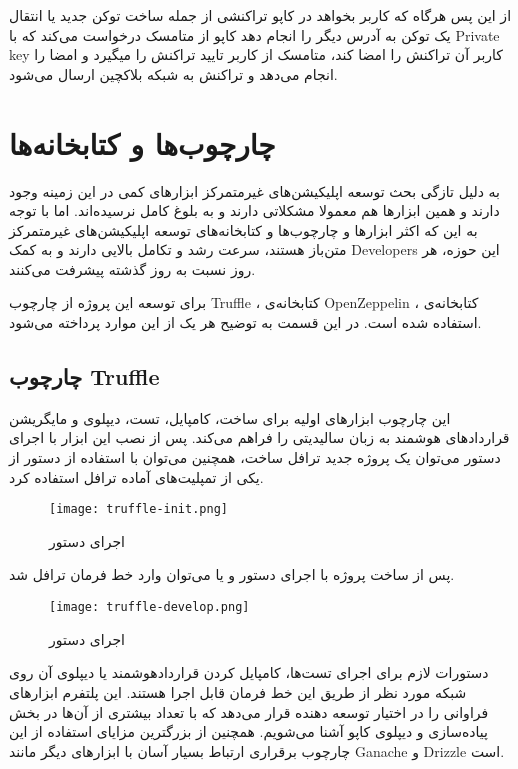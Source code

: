 از این پس هرگاه که کاربر بخواهد در کاپو تراکنشی از جمله ساخت توکن جدید یا انتقال یک توکن به آدرس دیگر را انجام دهد کاپو از متامسک درخواست می‌کند که با
\gls{Private key}
کاربر آن تراکنش را امضا کند، متامسک از کاربر تایید تراکنش را میگیرد و امضا را انجام می‌دهد و تراکنش به شبکه بلاکچین ارسال می‌شود.


\section{چارچوب‌ها و کتابخانه‌ها}
به دلیل تازگی بحث توسعه اپلیکیشن‌های غیرمتمرکز ابزارهای کمی در این زمینه وجود دارند و همین ابزارها هم معمولا مشکلاتی دارند و به بلوغ کامل نرسیده‌اند. اما با توجه به این که اکثر ابزارها و چارچوب‌ها و کتابخانه‌های توسعه اپلیکیشن‌های غیرمتمرکز متن‌باز هستند، سرعت رشد و تکامل بالایی دارند و به کمک
\glspl{Developer}
این حوزه، هر روز نسبت به روز گذشته پیشرفت می‌کنند.

برای توسعه این پروژه از
چارچوب Truffle
،
کتابخانه‌ی OpenZeppelin
،
کتابخانه‌ی
استفاده شده است. در این قسمت به توضیح هر یک از این موارد پرداخته می‌شود.

\subsection{چارچوب Truffle}
این چارچوب ابزارهای اولیه برای ساخت، کامپایل، تست، دیپلوی و مایگریشن قراردادهای هوشمند به زبان سالیدیتی را فراهم می‌کند. پس از نصب این ابزار با اجرای دستور
می‌توان یک پروژه جدید ترافل ساخت، همچنین می‌توان با استفاده از دستور
از یکی از تمپلیت‌های آماده ترافل استفاده کرد.

\begin{figure}[ht]
\centerline{\texttt{[image: truffle-init.png]}}
\caption{اجرای دستور }
\label{fig:truffle-init}
\end{figure}

پس از ساخت پروژه با اجرای دستور
و یا
 می‌توان وارد خط فرمان ترافل شد.

\begin{figure}[ht]
\centerline{\texttt{[image: truffle-develop.png]}}
\caption{اجرای دستور }
\label{fig:truffle-develop}
\end{figure}

دستورات لازم برای اجرای تست‌ها، کامپایل کردن قراردادهوشمند یا دیپلوی آن روی شبکه مورد نظر از طریق این خط فرمان قابل اجرا هستند. این پلتفرم ابزارهای فراوانی را در اختیار توسعه دهنده قرار می‌دهد که با تعداد بیشتری از آن‌ها در بخش پیاده‌سازی و دیپلوی کاپو آشنا می‌شویم. همچنین از بزرگترین مزایای استفاده از این چارچوب برقراری ارتباط بسیار آسان با ابزارهای دیگر مانند Ganache و Drizzle است.

